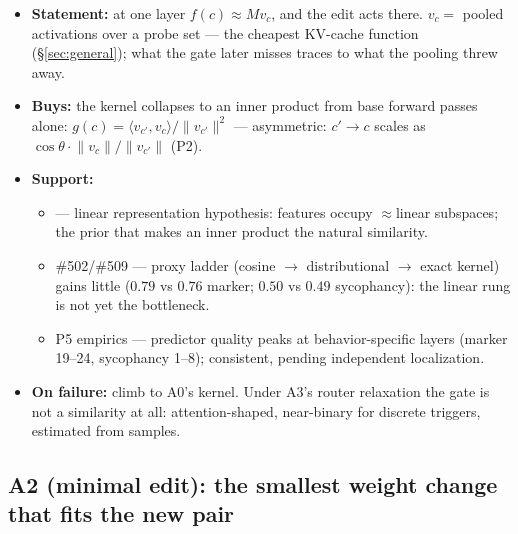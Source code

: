 \documentclass[11pt]{article}
\newcommand{\vc}{v_c}
\begin{document}
\begin{itemize}
\item \textbf{Statement:} at one layer $f(c) \approx M\vc$, and the edit acts there. $\vc =$ pooled activations over a probe set --- the cheapest KV-cache function (\S\ref{sec:general}); what the gate later misses traces to what the pooling threw away.
\item \textbf{Buys:} the kernel collapses to an inner product from base forward passes alone: $g(c) = \langle v_{c'}, \vc \rangle / \lVert v_{c'} \rVert^{2}$ --- asymmetric: $c' \to c$ scales as $\cos\theta \cdot \lVert \vc \rVert / \lVert v_{c'} \rVert$ (P2).
\item \textbf{Support:}
  \begin{itemize}
  \item \cite{park2023} --- linear representation hypothesis: features occupy $\approx$linear subspaces; the prior that makes an inner product the natural similarity.
  \item \#502/\#509 --- proxy ladder (cosine $\to$ distributional $\to$ exact kernel) gains little ($0.79$ vs $0.76$ marker; $0.50$ vs $0.49$ sycophancy): the linear rung is not yet the bottleneck.
  \item P5 empirics --- predictor quality peaks at behavior-specific layers (marker 19--24, sycophancy 1--8); consistent, pending independent localization.
  \end{itemize}
\item \textbf{On failure:} climb to A0's kernel. Under A3's router relaxation the gate is not a similarity at all: attention-shaped, near-binary for discrete triggers, estimated from samples.
\end{itemize}

\subsection*{A2 (minimal edit): the smallest weight change that fits the new pair}
\end{document}

